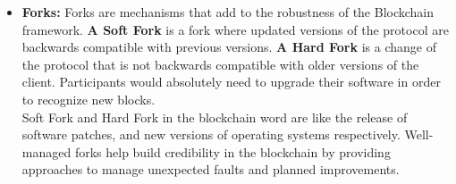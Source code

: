 \documentclass{article}
\begin{document}
\begin{itemize}
\begin{itemize}
     \end{itemize}
     \item \textbf{Forks:} Forks are mechanisms that add to the robustness of the Blockchain framework. \textbf{A Soft Fork} is a fork where updated versions of the protocol are backwards compatible with previous versions. 
     \textbf{A Hard Fork} is a change of the protocol that is not backwards compatible with older versions of the client. Participants would absolutely need to upgrade their software in order to recognize new blocks. \\
     Soft Fork and Hard Fork in the blockchain word are like the release of software patches, and new versions of operating systems respectively. Well-managed forks help build credibility in the blockchain by providing approaches to manage unexpected faults and planned improvements. 
    

     
 \end{itemize}
\end{document}
